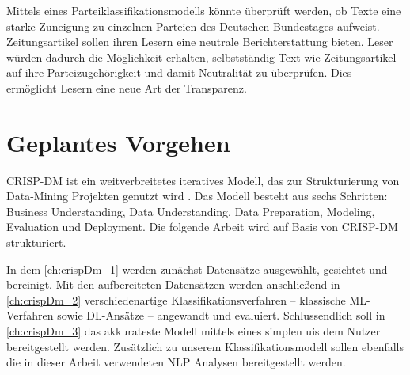 
Mittels eines Parteiklassifikationsmodells könnte überprüft werden, ob Texte eine starke Zuneigung zu einzelnen Parteien des Deutschen Bundestages aufweist. Zeitungsartikel sollen ihren Lesern eine neutrale Berichterstattung bieten. Leser würden dadurch die Möglichkeit erhalten, selbstständig Text wie Zeitungsartikel auf ihre Parteizugehörigkeit und damit Neutralität zu überprüfen. Dies ermöglicht Lesern eine neue Art der Transparenz.

\section{Geplantes Vorgehen}

\ac{CRISP-DM} ist ein weitverbreitetes iteratives Modell, das zur Strukturierung von Data-Mining Projekten genutzt wird \autocite{martinez-plumed_casp-dm_2017, chapman_crisp-dm_2000}. Das Modell besteht aus sechs Schritten: Business Understanding, Data Understanding, Data Preparation, Modeling, Evaluation und Deployment. Die folgende Arbeit wird auf Basis von \ac{CRISP-DM} strukturiert.

In dem \autoref{ch:crispDm_1} werden zunächst Datensätze ausgewählt, gesichtet und bereinigt. Mit den aufbereiteten Datensätzen werden anschließend in \autoref{ch:crispDm_2} verschiedenartige Klassifikationsverfahren -- klassische \ac{ML}-Verfahren sowie \ac{DL}-Ansätze -- angewandt und evaluiert. Schlussendlich soll in \autoref{ch:crispDm_3} das akkurateste Modell mittels eines simplen \acp{ui} dem Nutzer bereitgestellt werden. Zusätzlich zu unserem Klassifikationsmodell sollen ebenfalls die in dieser Arbeit verwendeten \ac{NLP} Analysen bereitgestellt werden.
